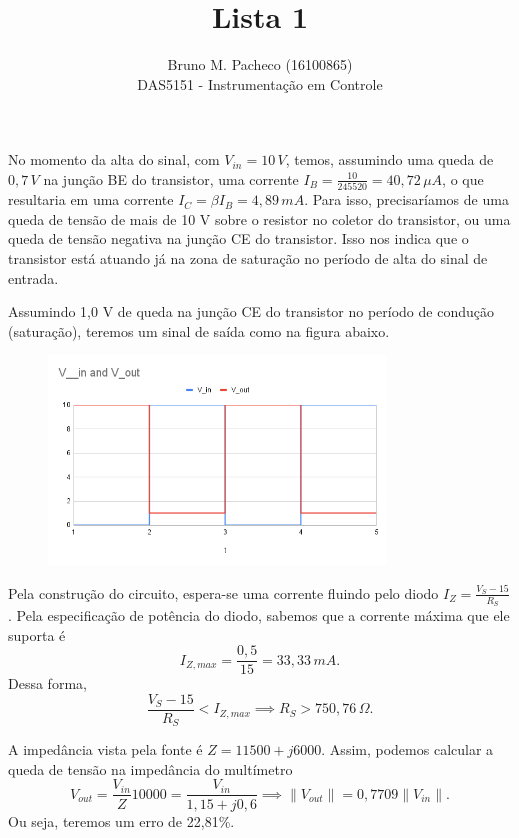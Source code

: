 \documentclass[a4paper]{report}
\begin{document}
 
\title{Lista 1}
\author{Bruno M. Pacheco (16100865)\\
DAS5151 - Instrumentação em Controle}
 
\maketitle
 

No momento da alta do sinal, com $V_{in} = 10\,V$, temos, assumindo uma queda de $0,7\,V$ na junção BE do transistor, uma corrente $I_B = \frac{10}{245520} = 40,72\,\mu A$, o que resultaria em uma corrente $I_C = \beta I_B = 4,89\,mA$. Para isso, precisaríamos de uma queda de tensão de mais de 10 V sobre o resistor no coletor do transistor, ou uma queda de tensão negativa na junção CE do transistor. Isso nos indica que o transistor está atuando já na zona de saturação no período de alta do sinal de entrada.

Assumindo 1,0 V de queda na junção CE do transistor no período de condução (saturação), teremos um sinal de saída como na figura abaixo.

\begin{figure}[H]
    \centering
    \includegraphics[width=0.8\textwidth]{figures/lista1-1.png}
\end{figure}


Pela construção do circuito, espera-se uma corrente fluindo pelo diodo $I_Z = \frac{V_S - 15}{R_S}$. Pela especificação de potência do diodo, sabemos que a corrente máxima que ele suporta é \[
I_{Z,max} = \frac{0,5}{15} = 33,33\,mA
.\] Dessa forma, \[
    \frac{V_S - 15}{R_S} < I_{Z,max} \implies R_S > 750,76\,\Omega
.\] 


A impedância vista pela fonte é $Z=11500 + j6000$. Assim, podemos calcular a queda de tensão na impedância do multímetro \[
V_{out} = \frac{V_{in}}{Z} 10000 = \frac{V_{in}}{1,15 + j0,6} \implies \|V_{out}\| = 0,7709 \|V_{in}\|
.\] Ou seja, teremos um erro de 22,81\%.
\end{document}
